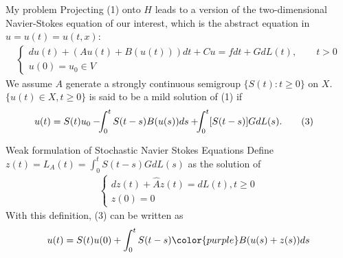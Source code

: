 \documentclass[xcolor=dvipsnames,leqno]{beamer}
\begin{document}
\begin{frame}{My problem}  
Projecting (1) onto $H$ leads to a version of the two-dimensional Navier-Stokes equation of our interest, which is the abstract equation in $u=u(t)=u(t,x)$:
	\begin{align*}\tag{2}%
			\begin{cases}
		        du(t)+(Au(t)+B(u(t)))dt+Cu=fdt+GdL(t), \qquad t>0\\
				u(0)=u_0\in V%
			\end{cases}
	\end{align*}  
We assume $A$ generate a strongly continuous semigroup $\{S(t): t\geq 0\}$ on $X$.  $\{u(t)\in X,t\geq 0\}$ is said to be a mild solution of (1) if
		\begin{align*}
			u(t)&=S(t)u_0-\hspace{-0.15cm}\int_{0}^{t} S(t-s)B(u(s))ds+\hspace{-0.15cm}\int_{0}^{t}[S(t-s)]GdL(s).\tag{3}
		\end{align*}
\end{frame} 
\begin{frame}{Weak formulation of Stochastic Navier Stokes Equations}
	Define $z(t)=L_A(t)=\int_{0}^t S(t-s)GdL(s)$ as the solution of
	\begin{align*}
		\begin{cases}
			dz(t)+\hat{A}z(t)=dL(t), t\geq 0\\
			z(0)=0
		\end{cases}
	\end{align*}
With this definition, (3) can be written as
\begin{align*}
	u(t)=S(t)u(0)+\int_{0}^{t}S(t-s){\color{purple}B}(u(s)+z(s))ds
\end{align*}
\end{frame}              
    
        
\end{document}
